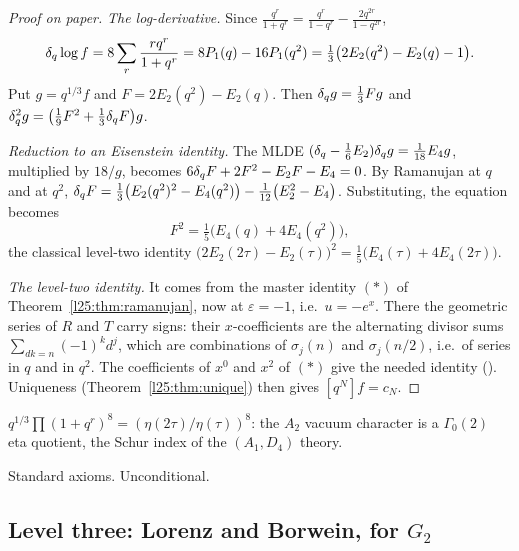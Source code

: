 \begin{proof}[Proof on paper]
\emph{The log-derivative.} Since $\frac{q^r}{1+q^r}=\frac{q^r}{1-q^r}-\frac{2q^{2r}}{1-q^{2r}}$,
\begin{equation*}
\delta_q\log f=8\sum_r\frac{rq^r}{1+q^r}=8P_1(q)-16P_1(q^2)=\tfrac13\big(2E_2(q^2)-E_2(q)-1\big).
\end{equation*}
Put $g=q^{1/3}f$ and $F=2E_2(q^2)-E_2(q)$. Then $\delta_q g=\frac13Fg$ and
$\delta_q^2g=\big(\frac19F^2+\frac13\delta_q F\big)g$.

\emph{Reduction to an Eisenstein identity.} The MLDE $(\delta_q-\frac16E_2)\delta_q g=\frac1{18}E_4g$, multiplied by
$18/g$, becomes $6\delta_q F+2F^2-E_2F-E_4=0$. By Ramanujan at $q$ and at $q^2$,
$\delta_q F=\frac13\big(E_2(q^2)^2-E_4(q^2)\big)-\frac1{12}\big(E_2^2-E_4\big)$. Substituting, the equation becomes
\begin{equation*}
F^2=\tfrac15\big(E_4(q)+4E_4(q^2)\big),
\end{equation*}
the classical level-two identity $\big(2E_2(2\tau)-E_2(\tau)\big)^2=\frac15\big(E_4(\tau)+4E_4(2\tau)\big)$.

\emph{The level-two identity.} It comes from the master identity $(*)$ of Theorem~\ref{l25:thm:ramanujan}, now at
$\varepsilon=-1$, i.e.\ $u=-e^x$. There the geometric series of $R$ and $T$ carry signs: their $x$-coefficients
are the alternating divisor sums $\sum_{dk=n}(-1)^kd^j$, which are combinations of $\sigma_j(n)$ and $\sigma_j(n/2)$,
i.e.\ of series in $q$ and in $q^2$. The coefficients of $x^0$ and $x^2$ of $(*)$ give the needed identity
(). Uniqueness (Theorem~\ref{l25:thm:unique}) then gives $[q^N]f=c_N$.
\end{proof}
\begin{physics}
$q^{1/3}\prod(1+q^r)^8=(\eta(2\tau)/\eta(\tau))^8$: the $A_2$ vacuum character is a $\Gamma_0(2)$ eta quotient, the
Schur index of the $(A_1,D_4)$ theory.
\end{physics}
\begin{status}
Standard axioms. Unconditional.
\end{status}

\subsection{Level three: Lorenz and Borwein, for \texorpdfstring{$G_2$}{G2}}

